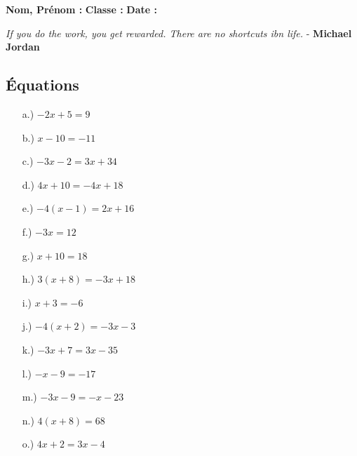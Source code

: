 \documentclass[11pt]{article}
\begin{document}

\newtheorem{Definition}{Définition}
\newtheorem{Theorem}{Théorème}
\newtheorem{Proposition}{Propriété}

\renewcommand{\labelitemi}{$\bullet$}
\renewcommand{\labelitemii}{$\circ$}

\setlength{\columnseprule}{1pt}

\textbf{Nom, Prénom :} \hspace{8cm} \textbf{Classe :} \hspace{3cm} \textbf{Date :}\\
\vspace{-0.8cm}
\begin{center}
  \textit{If you do the work, you get rewarded. There are no shortcuts ibn life.}  - \textbf{Michael Jordan}
\end{center}
\vspace{-0.8cm}

\subsection*{Équations}
\begin{multicols}{3}\noindent
  \begin{enumerate}
  \item[a.)] $-2x + 5 = 9$
  \item[b.)] $x - 10 = -11$
  \item[c.)] $-3x - 2 = 3x + 34$
  \item[d.)] $4x + 10 = -4x + 18$
  \item[e.)] $-4(x - 1) = 2x + 16$
  \item[f.)] $-3x = 12$
  \item[g.)] $x + 10 = 18$
  \item[h.)] $3(x + 8) = -3x + 18$
  \item[i.)] $x + 3 = -6$
  \item[j.)] $-4(x + 2) = -3x - 3$
  \item[k.)] $-3x + 7 = 3x - 35$
  \item[l.)] $-x - 9 = -17$
  \item[m.)] $-3x - 9 = -x - 23$
  \item[n.)] $4(x + 8) = 68$
  \item[o.)] $4x + 2 = 3x - 4$
  \end{enumerate}
\end{multicols}
\end{document}
